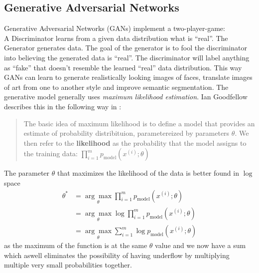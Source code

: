 

\subsection{Generative Adversarial Networks}
Generative Adversarial Networks (GANs) implement a two-player-game:\\
A Discriminator learns from a given data distribution what is ``real''. The Generator generates data. The goal of the generator is to fool the discriminator into believing the generated data is ``real''. The discriminator will label anything as ``fake'' that doesn't resemble the learned ``real'' data distribution. This way GANs can learn to generate realistically looking images of faces, translate images of art from one to another style and improve semantic segmentation.
The generative model generally uses \textit{maximum likelihood estimation}. Ian Goodfellow describes this in the following way in \cite{DBLP:journals/corr/Goodfellow17}:
\begin{quote}
	The basic idea of maximum likelihood is to define a model that provides an estimate of probability distribituion, parametereized by parameters $\theta$. We then refer to the \textbf{likelihood} as the probability that the model assigns to the training data: $\prod_{i=1}^{m}p_{\text{model}}(x^{(i)}; \theta)$
\end{quote}
The parameter $\theta$ that maximizes the likelihood of the data is better found in $\log$ space \cite{DBLP:journals/corr/Goodfellow17}
\begin{align}
	\theta^* &= \underset{\theta}{\arg \max} \prod_{i = 1}^{m} p_{\text{model}} (x^{(i)}; \theta)\\
	&= \underset{\theta}{\arg \max} \log \prod_{i=1}^{m} p_{\text{model}}(x^{(i)}; \theta)\\
	&= \underset{\theta}{\arg \max} \sum_{i = 1}^{m} \log p_{\text{model}}(x^{(i)}; \theta)
\end{align}
as the maximum of the function is at the same $\theta$ value and we now have a sum which aswell eliminates the possibility of having underflow by multiplying multiple very small probabilities together.



